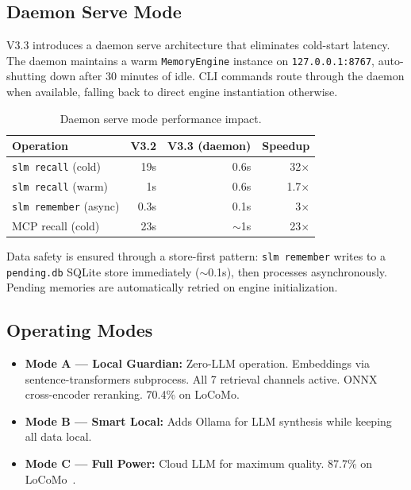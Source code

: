 \subsection{Daemon Serve Mode}

V3.3 introduces a daemon serve architecture that eliminates cold-start latency. The daemon maintains a warm \texttt{MemoryEngine} instance on \texttt{127.0.0.1:8767}, auto-shutting down after 30 minutes of idle. CLI commands route through the daemon when available, falling back to direct engine instantiation otherwise.

\begin{table}[h]
\centering
\caption{Daemon serve mode performance impact.}
\small
\begin{tabular}{lrrr}
\toprule
\textbf{Operation} & \textbf{V3.2} & \textbf{V3.3 (daemon)} & \textbf{Speedup} \\
\midrule
\texttt{slm recall} (cold) & 19s & 0.6s & 32$\times$ \\
\texttt{slm recall} (warm) & 1s & 0.6s & 1.7$\times$ \\
\texttt{slm remember} (async) & 0.3s & 0.1s & 3$\times$ \\
MCP recall (cold) & 23s & $\sim$1s & 23$\times$ \\
\bottomrule
\end{tabular}
\end{table}

Data safety is ensured through a store-first pattern: \texttt{slm remember} writes to a \texttt{pending.db} SQLite store immediately ($\sim$0.1s), then processes asynchronously. Pending memories are automatically retried on engine initialization.

\subsection{Operating Modes}

\begin{itemize}[topsep=2pt, itemsep=1pt]
  \item \textbf{Mode A --- Local Guardian:} Zero-LLM operation. Embeddings via sentence-transformers subprocess. All 7 retrieval channels active. ONNX cross-encoder reranking. 70.4\% on LoCoMo.
  \item \textbf{Mode B --- Smart Local:} Adds Ollama for LLM synthesis while keeping all data local.
  \item \textbf{Mode C --- Full Power:} Cloud LLM for maximum quality. 87.7\% on LoCoMo~\cite{slm-paper2}.
\end{itemize}

